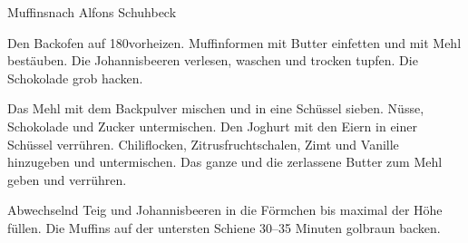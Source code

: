 \begin{recipe}{Muffins}{nach Alfons Schuhbeck}
  \label{Muffins}
  \inglist

  \steps

  Den Backofen auf 180\celsius vorheizen. Muffinformen mit Butter einfetten
  und mit Mehl bestäuben. Die Johannisbeeren verlesen, waschen und trocken
  tupfen. Die Schokolade grob hacken.

  Das Mehl mit dem Backpulver mischen und in eine Schüssel sieben. Nüsse,
  Schokolade und Zucker untermischen. Den Joghurt mit den Eiern in einer
  Schüssel verrühren. Chiliflocken, Zitrusfruchtschalen, Zimt und Vanille
  hinzugeben und untermischen. Das ganze und die zerlassene Butter zum Mehl
  geben und verrühren.

  Abwechselnd Teig und Johannisbeeren in die Förmchen bis maximal
  \dreiviertel der Höhe füllen. Die Muffins auf der untersten Schiene 30--35
  Minuten golbraun backen.

\end{recipe}
